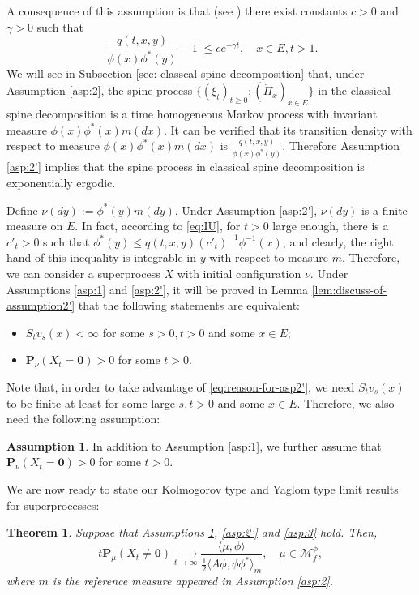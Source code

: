 \documentclass[UTF8]{pkuthss}
\theoremstyle{plain}
\newtheorem{thm}{Theorem}[section]
\theoremstyle{definition}
\newtheorem{asp}{Assumption}[chapter]
\numberwithin{equation}{section}
\begin{document}
		A consequence of this assumption is that (see \cite[Theorem 2.7]{KimSong2008Intrinsic})
there exist constants $c>0$ and $\gamma >0$ such that
\begin{equation}\label{eq:IU}
	\Big|\frac{q(t,x,y)}{\phi(x)\phi^*(y)} - 1\Big| \leq c e^{-\gamma t}, \quad x\in E, t> 1.
\end{equation}
	We will see in Subsection \ref{sec: classcal spine decomposition} that, under Assumption \ref{asp:2}, the spine process $\{(\xi_t)_{t\geq 0}; (\dot{\Pi}_x)_{x\in E}\}$ in the classical spine decomposition is a time homogeneous Markov process with invariant measure $\phi(x)\phi^*(x)m(dx)$.
	It can be verified that its transition density with respect to measure $\phi(x)\phi^*(x)m(dx)$ is
$
\frac{q(t,x,y)}{\phi(x)\phi^*(y)}.
$
Therefore Assumption \ref{asp:2'} implies that the spine process in classical spine decomposition is exponentially ergodic.

	Define $\nu(dy) := \phi^*(y)m(dy)$.
	Under Assumption \ref{asp:2'},  $\nu(dy)$ is a finite measure on $E$.
	In fact, according to \eqref{eq:IU}, for $t>0$ large enough, there is a $c'_t>0$ such that $\phi^*(y) \leq q(t,x,y)  (c'_t)^{-1}\phi^{-1}(x)$,
	and clearly, the right hand of this inequality is integrable in $y$ with respect to measure $m$.
    Therefore, we can consider a superprocess $X$ with initial configuration $\nu$.
    Under Assumptions \ref{asp:1} and \ref{asp:2'}, it will be proved in Lemma \ref{lem:discuss-of-assumption2'} that the following statements are equivalent:
\begin{itemize}
\item
	$S_tv_s(x)<\infty$ for some $s>0,t>0$ and some $x\in E$;
\item
	$\mathbf P_\nu (X_t = \mathbf 0) > 0$ for some $t>0$.
\end{itemize}
	Note that, in order to take advantage of \eqref{eq:reason-for-asp2'}, we need $S_t v_s(x)$ to be finite at least for some large $s,t>0$ and  some $x\in E$.
	Therefore, we also need the following assumption:
	
\begin{asp}
\label{asp:1'}
	In addition to Assumption \ref{asp:1}, we further assume that $\mathbf P_\nu (X_t = \mathbf 0) > 0$ for some $t>0$.
\end{asp}
	
	We are now ready to state our Kolmogorov type and Yaglom type limit results for superprocesses:
\begin{thm}\label{thm:Kolmogorov-type-of-theorem}
	Suppose that Assumptions  \ref{asp:1'}, \ref{asp:2'} and \ref{asp:3} hold. Then,
\[
	t\mathbf P_\mu(X_t\neq \mathbf 0)
	\xrightarrow[t\to\infty]{} \frac{\langle \mu,\phi\rangle} {\frac{1}{2}\langle  A \phi,\phi \phi^*\rangle_m},
	\quad \mu\in \mathcal M^\phi_f,
\]
where $m$ is the reference measure appeared in Assumption \ref{asp:2}.
\end{thm}
\end{document}
